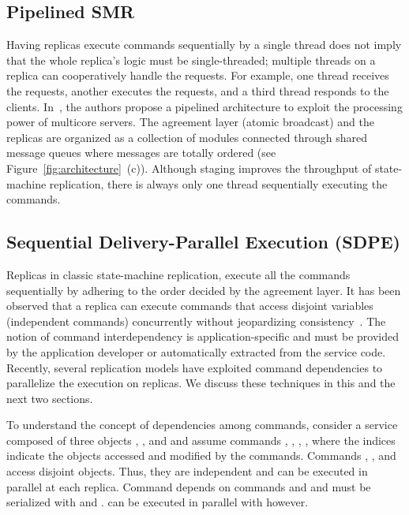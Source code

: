 \documentclass[conference]{IEEEtran}
\begin{document}
\subsection{Pipelined SMR}
\label{sec:pipelinedsmr}
Having replicas execute commands sequentially by a single thread does not imply that the whole replica's logic must be single-threaded; multiple threads on a replica can cooperatively handle the requests. For example, one thread receives the requests, another executes the requests, and a third thread responds to the clients. 
In~\cite{SS2011}, the authors propose a pipelined architecture to exploit the processing power of multicore servers. 
The agreement layer (atomic broadcast) and the replicas are organized as a collection of modules connected through shared message queues where messages are totally ordered (see Figure~\ref{fig:architecture}~(c)). 
Although staging improves the throughput of state-machine replication, there is always only one thread sequentially executing the commands. 


\subsection{Sequential Delivery-Parallel Execution (SDPE)}
\label{sec:sdpe}

Replicas in classic state-machine replication, execute all the commands sequentially by adhering to the order decided by the agreement layer. 
It has been observed that a replica can execute commands that access disjoint variables (independent commands) concurrently without jeopardizing consistency~\cite{Sch90}. 
The notion of command interdependency is application-specific and must be provided by the application developer or automatically extracted from the service code. Recently, several replication models have exploited command dependencies to parallelize the execution on replicas. 
We discuss these techniques in this and the next two sections. 

To understand the concept of dependencies among commands, consider a service composed of three objects , , and  and assume commands , , , , where the indices indicate the objects accessed and modified by the commands. 
Commands , , and  access disjoint objects.
Thus, they are independent and can be executed in parallel at each replica. 
Command  depends on commands  and  and must be serialized with  and . 
 can be executed in parallel with  however. 
\end{document}
